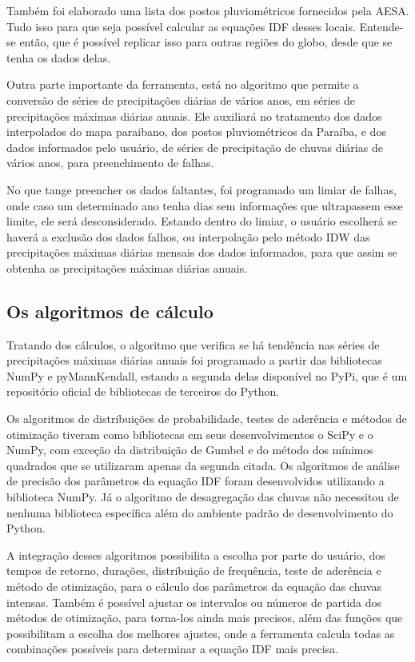 Também foi elaborado uma lista dos postos pluviométricos fornecidos pela AESA. Tudo isso para que seja possível calcular as equações IDF desses locais. Entende-se então, que é possível replicar isso para outras regiões do globo, desde que se tenha os dados delas. 

Outra parte importante da ferramenta, está no algoritmo que permite a conversão de séries de precipitações diárias de vários anos, em séries de precipitações máximas diárias anuais. Ele auxiliará no tratamento dos dados interpolados do mapa paraibano, dos postos pluviométricos da Paraíba, e dos dados informados pelo usuário, de séries de precipitação de chuvas diárias de vários anos, para preenchimento de falhas.

No que tange preencher os dados faltantes, foi programado um limiar de falhas, onde caso um determinado ano tenha dias sem informações que ultrapassem esse limite, ele será desconsiderado. Estando dentro do limiar, o usuário escolherá se haverá a exclusão dos dados falhos, ou interpolação pelo método IDW das precipitações máximas diárias mensais dos dados informados, para que assim se obtenha as precipitações máximas diárias anuais.

\subsection{Os algoritmos de cálculo}

Tratando dos cálculos, o algoritmo que verifica se há tendência nas séries de precipitações máximas diárias anuais foi programado a partir das bibliotecas NumPy e pyMannKendall, estando a segunda delas disponível no PyPi, que é um repositório oficial de bibliotecas de terceiros do Python. 

Os algoritmos de distribuições de probabilidade, testes de aderência e métodos de otimização tiveram como bibliotecas em seus desenvolvimentos o SciPy e o NumPy, com exceção da distribuição de Gumbel e do método dos mínimos quadrados que se utilizaram apenas da segunda citada. Os algoritmos de análise de precisão dos parâmetros da equação IDF foram desenvolvidos utilizando a biblioteca NumPy. Já o algoritmo de desagregação das chuvas não necessitou de nenhuma biblioteca específica além do ambiente padrão de desenvolvimento do Python.

A integração desses algoritmos possibilita a escolha por parte do usuário, dos tempos de retorno, durações, distribuição de frequência, teste de aderência e método de otimização, para o cálculo dos parâmetros da equação das chuvas intensas. Também é possível ajustar os intervalos ou números de partida dos métodos de otimização, para torna-los ainda mais precisos, além das funções que possibilitam a escolha dos melhores ajustes, onde a ferramenta calcula todas as combinações possíveis para determinar a equação IDF mais precisa.

